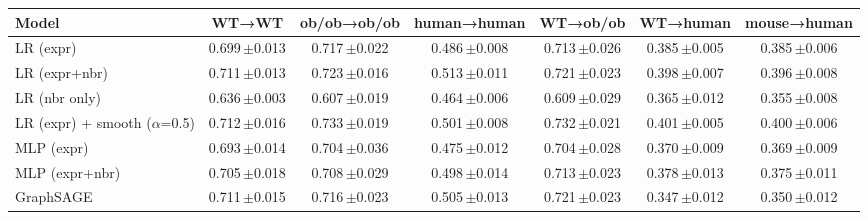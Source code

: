 \begin{tabular}{lcccccc}
\toprule
Model & WT→WT & ob/ob→ob/ob & human→human & WT→ob/ob & WT→human & mouse→human \\
\midrule
LR (expr) & 0.699\,{\scriptsize$\pm$0.013} & 0.717\,{\scriptsize$\pm$0.022} & 0.486\,{\scriptsize$\pm$0.008} & 0.713\,{\scriptsize$\pm$0.026} & 0.385\,{\scriptsize$\pm$0.005} & 0.385\,{\scriptsize$\pm$0.006} \\
LR (expr+nbr) & 0.711\,{\scriptsize$\pm$0.013} & 0.723\,{\scriptsize$\pm$0.016} & 0.513\,{\scriptsize$\pm$0.011} & 0.721\,{\scriptsize$\pm$0.023} & 0.398\,{\scriptsize$\pm$0.007} & 0.396\,{\scriptsize$\pm$0.008} \\
LR (nbr only) & 0.636\,{\scriptsize$\pm$0.003} & 0.607\,{\scriptsize$\pm$0.019} & 0.464\,{\scriptsize$\pm$0.006} & 0.609\,{\scriptsize$\pm$0.029} & 0.365\,{\scriptsize$\pm$0.012} & 0.355\,{\scriptsize$\pm$0.008} \\
LR (expr) + smooth ($\alpha$=0.5) & 0.712\,{\scriptsize$\pm$0.016} & 0.733\,{\scriptsize$\pm$0.019} & 0.501\,{\scriptsize$\pm$0.008} & 0.732\,{\scriptsize$\pm$0.021} & 0.401\,{\scriptsize$\pm$0.005} & 0.400\,{\scriptsize$\pm$0.006} \\
MLP (expr) & 0.693\,{\scriptsize$\pm$0.014} & 0.704\,{\scriptsize$\pm$0.036} & 0.475\,{\scriptsize$\pm$0.012} & 0.704\,{\scriptsize$\pm$0.028} & 0.370\,{\scriptsize$\pm$0.009} & 0.369\,{\scriptsize$\pm$0.009} \\
MLP (expr+nbr) & 0.705\,{\scriptsize$\pm$0.018} & 0.708\,{\scriptsize$\pm$0.029} & 0.498\,{\scriptsize$\pm$0.014} & 0.713\,{\scriptsize$\pm$0.023} & 0.378\,{\scriptsize$\pm$0.013} & 0.375\,{\scriptsize$\pm$0.011} \\
GraphSAGE & 0.711\,{\scriptsize$\pm$0.015} & 0.716\,{\scriptsize$\pm$0.023} & 0.505\,{\scriptsize$\pm$0.013} & 0.721\,{\scriptsize$\pm$0.023} & 0.347\,{\scriptsize$\pm$0.012} & 0.350\,{\scriptsize$\pm$0.012} \\
\bottomrule
\end{tabular}
